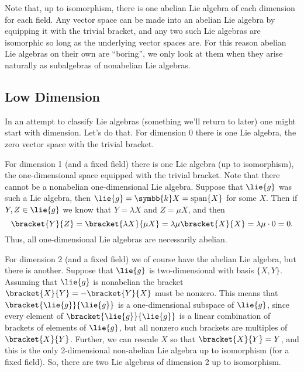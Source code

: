 \documentclass[fleqn]{NotesClass}
\renewcommand{\field}{\symbb{k}}
\DeclareMathOperator{\Span}{span}
\begin{document}
    Note that, up to isomorphism, there is one abelian Lie algebra of each dimension for each field.
    Any vector space can be made into an abelian Lie algebra by equipping it with the trivial bracket, and any two such Lie algebras are isomorphic so long as the underlying vector spaces are.
    For this reason abelian Lie algebras on their own are \enquote{boring}, we only look at them when they arise naturally as subalgebras of nonabelian Lie algebras.
    
    \subsection{Low Dimension}
    In an attempt to classify Lie algebras (something we'll return to later) one might start with dimension.
    Let's do that.
    For dimension 0 there is one Lie algebra, the zero vector space with the trivial bracket.
    
    For dimension 1 (and a fixed field) there is one Lie algebra (up to isomorphism), the one-dimensional space equipped with the trivial bracket.
    Note that there cannot be a nonabelian one-dimensional Lie algebra.
    Suppose that \(\lie{g}\) was such a Lie algebra, then \(\lie{g} = \field X = \Span\{X\}\) for some \(X\).
    Then if \(Y, Z \in \lie{g}\) we know that \(Y = \lambda X\) and \(Z = \mu X\), and then
    \begin{equation}
        \bracket{Y}{Z} = \bracket{\lambda X}{\mu X} = \lambda \mu \bracket{X}{X} = \lambda \mu \cdot 0 = 0.
    \end{equation}
    Thus, all one-dimensional Lie algebras are necessarily abelian.
    
    For dimension 2 (and a fixed field) we of course have the abelian Lie algebra, but there is another.
    Suppose that \(\lie{g}\) is two-dimensional with basis \(\{X, Y\}\).
    Assuming that \(\lie{g}\) is nonabelian the bracket \(\bracket{X}{Y} = -\bracket{Y}{X}\) must be nonzero.
    This means that \(\bracket{\lie{g}}{\lie{g}}\) is a one-dimensional subspace of \(\lie{g}\), since every element of \(\bracket{\lie{g}}{\lie{g}}\) is a linear combination of brackets of elements of \(\lie{g}\), but all nonzero such brackets are multiples of \(\bracket{X}{Y}\).
    Further, we can rescale \(X\) so that \(\bracket{X}{Y} = Y\), and this is the only 2-dimensional non-abelian Lie algebra up to isomorphism (for a fixed field).
    So, there are two Lie algebras of dimension 2 up to isomorphism.
    
\end{document}
